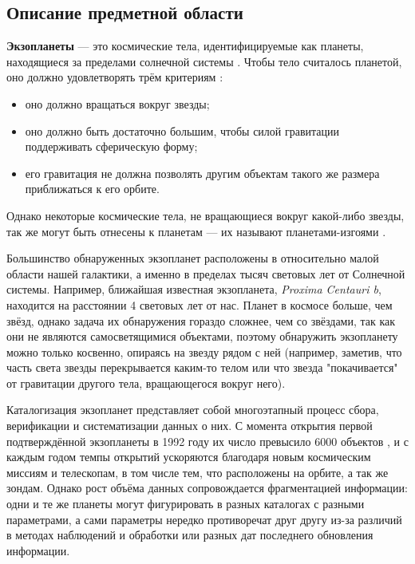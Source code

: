 \documentclass[14pt,a4paper]{extarticle}
\begin{document}
	\subsection{Описание предметной области}
	\label{object-description}
	
	\textbf{Экзопланеты} --- это космические тела, идентифицируемые как планеты, находящиеся за пределами солнечной системы \cite{exoplanet}. Чтобы тело считалось планетой, оно должно удовлетворять трём критериям \cite{planet}: 
	\begin{itemize}
		\item оно должно вращаться вокруг звезды; 
		\item оно должно быть достаточно большим, чтобы силой гравитации поддерживать сферическую форму; 
		\item его гравитация не должна позволять другим объектам такого же размера приближаться к его орбите.
	\end{itemize}
	
	Однако некоторые космические тела, не вращающиеся вокруг какой-либо звезды, так же могут быть отнесены к планетам --- их называют планетами-изгоями \cite{exoplanet}.
	
	Большинство обнаруженных экзопланет расположены в относительно малой области нашей галактики, а именно в пределах тысяч световых лет от Солнечной системы. Например, ближайшая известная экзопланета, \textit{Proxima Centauri b}, находится на расстоянии 4 световых лет от нас. Планет в космосе больше, чем звёзд, однако задача их обнаружения гораздо сложнее, чем со звёздами, так как они не являются самосветящимися объектами, поэтому обнаружить экзопланету можно только косвенно, опираясь на звезду рядом с ней (например, заметив, что часть света звезды перекрывается каким-то телом или что звезда "покачивается" от гравитации другого тела, вращающегося вокруг него).
	
	Каталогизация экзопланет представляет собой многоэтапный процесс сбора, верификации и систематизации данных о них. С момента открытия первой подтверждённой экзопланеты в 1992 году их число превысило 6000 объектов \cite{exoplanet}, и с каждым годом темпы открытий ускоряются благодаря новым космическим миссиям и телескопам, в том числе тем, что расположены на орбите, а так же зондам. Однако рост объёма данных сопровождается фрагментацией информации: одни и те же планеты могут фигурировать в разных каталогах с разными параметрами, а сами параметры нередко противоречат друг другу из-за различий в методах наблюдений и обработки или разных дат последнего обновления информации.
	
\end{document}
